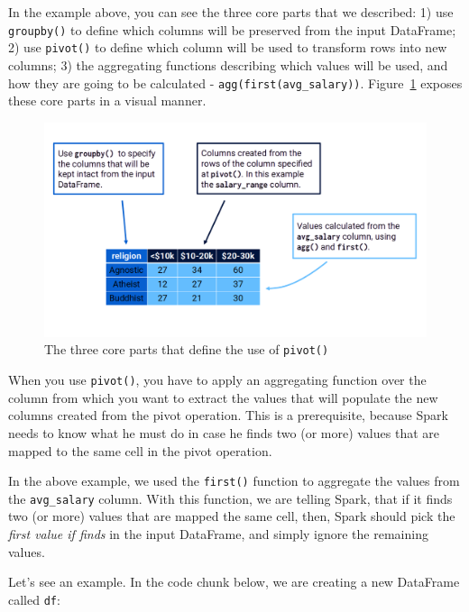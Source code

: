 \documentclass[
  11pt,
  letterpaper,
  DIV=11,
  numbers=noendperiod]{scrreprt}
\begin{document}
In the example above, you can see the three core parts that we
described: 1) use \texttt{groupby()} to define which columns will be
preserved from the input DataFrame; 2) use \texttt{pivot()} to define
which column will be used to transform rows into new columns; 3) the
aggregating functions describing which values will be used, and how they
are going to be calculated -
\texttt{agg(first(\textquotesingle{}avg\_salary\textquotesingle{}))}.
Figure~\ref{fig-pivot2} exposes these core parts in a visual manner.

\begin{figure}

{\centering \includegraphics{Chapters/./../Figures/pivot2.png}

}

\caption{\label{fig-pivot2}The three core parts that define the use of
\texttt{pivot()}}

\end{figure}

When you use \texttt{pivot()}, you have to apply an aggregating function
over the column from which you want to extract the values that will
populate the new columns created from the pivot operation. This is a
prerequisite, because Spark needs to know what he must do in case he
finds two (or more) values that are mapped to the same cell in the pivot
operation.

In the above example, we used the \texttt{first()} function to aggregate
the values from the \texttt{avg\_salary} column. With this function, we
are telling Spark, that if it finds two (or more) values that are mapped
the same cell, then, Spark should pick the \emph{first value if finds}
in the input DataFrame, and simply ignore the remaining values.

Let's see an example. In the code chunk below, we are creating a new
DataFrame called \texttt{df}:
\end{document}
